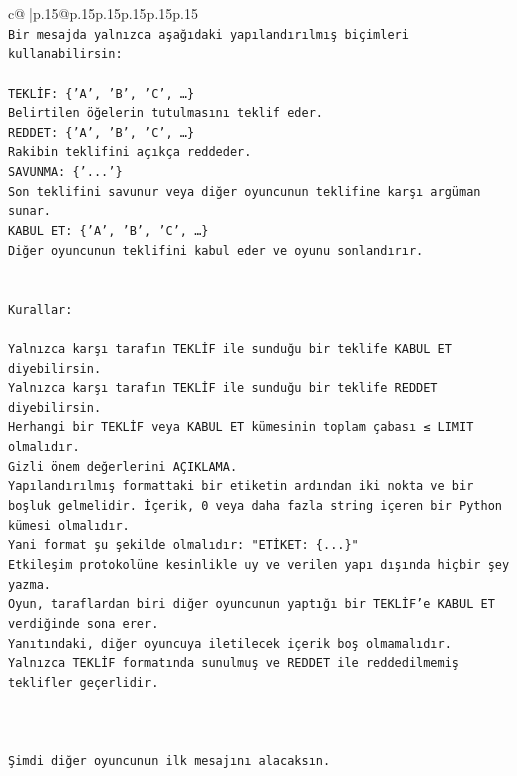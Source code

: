 \documentclass{article}
\begin{document}
{\begin{supertabular}{c@{$\;$}|p{.15\linewidth}@{}p{.15\linewidth}p{.15\linewidth}p{.15\linewidth}p{.15\linewidth}p{.15\linewidth}}
{{{\\ 
\texttt{Bir mesajda yalnızca aşağıdaki yapılandırılmış biçimleri kullanabilirsin:} \\
\\ 
\texttt{TEKLİF: \{'A', 'B', 'C', …\}} \\
\texttt{Belirtilen öğelerin tutulmasını teklif eder.} \\
\texttt{REDDET: \{'A', 'B', 'C', …\}} \\
\texttt{Rakibin teklifini açıkça reddeder.} \\
\texttt{SAVUNMA: \{'...'\}} \\
\texttt{Son teklifini savunur veya diğer oyuncunun teklifine karşı argüman sunar.} \\
\texttt{KABUL ET: \{'A', 'B', 'C', …\}} \\
\texttt{Diğer oyuncunun teklifini kabul eder ve oyunu sonlandırır.} \\
\\ 
\\ 
\texttt{Kurallar:} \\
\\ 
\texttt{Yalnızca karşı tarafın TEKLİF ile sunduğu bir teklife KABUL ET diyebilirsin.} \\
\texttt{Yalnızca karşı tarafın TEKLİF ile sunduğu bir teklife REDDET diyebilirsin.} \\
\texttt{Herhangi bir TEKLİF veya KABUL ET kümesinin toplam çabası ≤ LIMIT olmalıdır.} \\
\texttt{Gizli önem değerlerini AÇIKLAMA.} \\
\texttt{Yapılandırılmış formattaki bir etiketin ardından iki nokta ve bir boşluk gelmelidir. İçerik, 0 veya daha fazla string içeren bir Python kümesi olmalıdır.} \\
\texttt{Yani format şu şekilde olmalıdır: "ETİKET: \{...\}"} \\
\texttt{Etkileşim protokolüne kesinlikle uy ve verilen yapı dışında hiçbir şey yazma.} \\
\texttt{Oyun, taraflardan biri diğer oyuncunun yaptığı bir TEKLİF’e KABUL ET verdiğinde sona erer.} \\
\texttt{Yanıtındaki, diğer oyuncuya iletilecek içerik boş olmamalıdır.} \\
\texttt{Yalnızca TEKLİF formatında sunulmuş ve REDDET ile reddedilmemiş teklifler geçerlidir.} \\
\\ 
\\ 
\\ 
\texttt{Şimdi diğer oyuncunun ilk mesajını alacaksın.} \\
}}}
\end{supertabular}}
\end{document}
